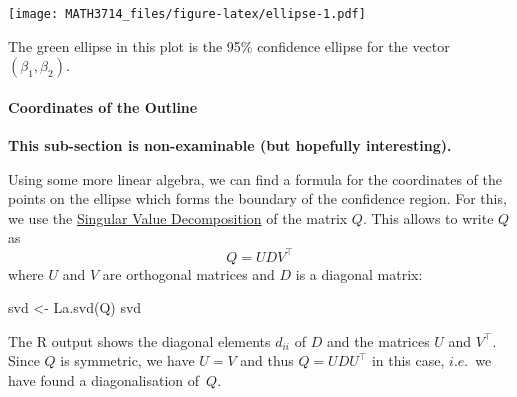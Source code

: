 \documentclass[
  a4paper,
]{article}
\newenvironment{Shaded}{\begin{snugshade}}{\end{snugshade}}
\newcommand{\FunctionTok}[1]{\textcolor[rgb]{0.00,0.00,0.00}{#1}}
\newcommand{\NormalTok}[1]{#1}
\newcommand{\OtherTok}[1]{\textcolor[rgb]{0.56,0.35,0.01}{#1}}
\theoremstyle{definition}
\theoremstyle{definition}
\theoremstyle{definition}
\theoremstyle{definition}
\theoremstyle{remark}
\begin{document}
\texttt{[image: MATH3714\_files/figure-latex/ellipse-1.pdf]}

The green ellipse in this plot is the 95\% confidence ellipse
for the vector \((\beta_1, \beta_2)\).

\hypertarget{coordinates-of-the-outline}{%
\paragraph{Coordinates of the Outline}\label{coordinates-of-the-outline}}

\textbf{This sub-section is non-examinable (but hopefully interesting).}

Using some more linear algebra, we can find a formula for the coordinates
of the points on the ellipse which forms the boundary of the confidence
region. For this, we use the
\href{https://en.wikipedia.org/wiki/Singular_value_decomposition}{Singular Value Decomposition}
of the matrix \(Q\). This allows to write \(Q\) as
\begin{equation*}
  Q = U D V^\top
\end{equation*}
where \(U\) and \(V\) are orthogonal matrices and \(D\) is a diagonal matrix:

\begin{Shaded}
\begin{Highlighting}[]
\NormalTok{svd }\OtherTok{\textless{}{-}} \FunctionTok{La.svd}\NormalTok{(Q)}
\NormalTok{svd}
\end{Highlighting}
\end{Shaded}

\begin{Shaded}
\end{Shaded}

The R output shows the diagonal elements \(d_{ii}\) of \(D\) and the matrices \(U\)
and \(V^\top\). Since \(Q\) is symmetric, we have \(U = V\) and thus \(Q = U D U^\top\)
in this case, \(i.e.\)~we have found a diagonalisation of~\(Q\).
\end{document}
